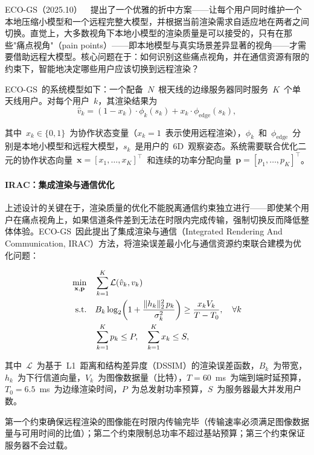 ECO-GS（2025.10）~\cite{2510_22718}~提出了一个优雅的折中方案——让每个用户同时维护一个本地压缩小模型和一个远程完整大模型，并根据当前渲染需求自适应地在两者之间切换。直觉上，大多数视角下本地小模型的渲染质量是可以接受的，只有在那些"痛点视角"（pain points）——即本地模型与真实场景差异显著的视角——才需要借助远程大模型。核心问题在于：如何识别这些痛点视角，并在通信资源有限的约束下，智能地决定哪些用户应该切换到远程渲染？

ECO-GS~的系统模型如下：一个配备~$N$~根天线的边缘服务器同时服务~$K$~个单天线用户。对每个用户~$k$，其渲染结果为
\begin{equation}
\hat{v}_k = (1 - x_k) \cdot \phi_k(s_k) + x_k \cdot \phi_\text{edge}(s_k),
\end{equation}

其中~$x_k \in \{0,1\}$~为协作状态变量（$x_k=1$~表示使用远程渲染），$\phi_k$~和~$\phi_\text{edge}$~分别是本地小模型和远程大模型，$s_k$~是用户的~6D~观察姿态。系统需要联合优化二元的协作状态向量~$\mathbf{x}=[x_1, \ldots, x_K]^\top$~和连续的功率分配向量~$\mathbf{p}=[p_1, \ldots, p_K]^\top$。

\paragraph{IRAC：集成渲染与通信优化}

上述设计的关键在于，渲染质量的优化不能脱离通信约束独立进行——即使某个用户在痛点视角上，如果信道条件差到无法在时限内完成传输，强制切换反而降低整体体验。ECO-GS~因此提出了集成渲染与通信（Integrated Rendering And Communication, IRAC）方法，将渲染误差最小化与通信资源约束联合建模为优化问题：

\begin{align}
\min_{\mathbf{x}, \mathbf{p}} \quad & \sum_{k=1}^{K} \mathcal{L}(\hat{v}_k, v_k) \notag \\
\text{s.t.} \quad & B_k \log_2\!\left(1 + \frac{\|h_k\|_2^2 \, p_k}{\sigma_k^2}\right) \geq \frac{x_k V_k}{T - T_0}, \quad \forall k \notag \\
& \sum_{k=1}^{K} p_k \leq P, \quad \sum_{k=1}^{K} x_k \leq S,
\end{align}

其中~$\mathcal{L}$~为基于~L1~距离和结构差异度（DSSIM）的渲染误差函数，$B_k$~为带宽，$h_k$~为下行信道向量，$V_k$~为图像数据量（比特），$T=60$~ms~为端到端时延预算，$T_0=6.5$~ms~为边缘渲染时间，$P$~为总发射功率预算，$S$~为服务器最大并发用户数。

第一个约束确保远程渲染的图像能在时限内传输完毕（传输速率必须满足图像数据量与可用时间的比值）；第二个约束限制总功率不超过基站预算；第三个约束保证服务器不会过载。

